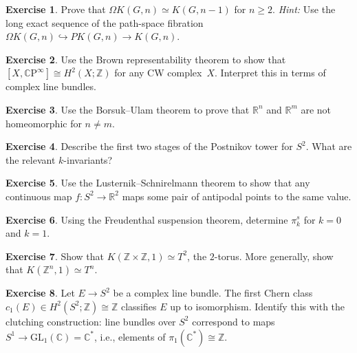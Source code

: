 \documentclass[12pt,a4paper,openany]{book}
\theoremstyle{definition}
\newtheorem{exercise}{Exercise}[chapter]
\theoremstyle{plain}
\theoremstyle{remark}
\newcommand{\Z}{\mathbb{Z}}
\newcommand{\R}{\mathbb{R}}
\newcommand{\C}{\mathbb{C}}
\newcommand{\CP}{\mathbb{C}\mathrm{P}}
\begin{document}
\begin{exercise}
Prove that $\Omega K(G,n)\simeq K(G,n-1)$ for $n\ge2$.
\textit{Hint:} Use the long exact sequence of the path-space fibration
$\Omega K(G,n)\hookrightarrow PK(G,n)\to K(G,n)$.
\end{exercise}

\begin{exercise}
Use the Brown representability theorem to show that
$[X,\CP^\infty]\cong H^2(X;\Z)$ for any CW complex~$X$.  Interpret
this in terms of complex line bundles.
\end{exercise}

\begin{exercise}
Use the Borsuk--Ulam theorem to prove that $\R^n$ and $\R^m$ are not
homeomorphic for $n\ne m$.
\end{exercise}

\begin{exercise}
Describe the first two stages of the Postnikov tower for $S^2$.
What are the relevant $k$-invariants?
\end{exercise}

\begin{exercise}
Use the Lusternik--Schnirelmann theorem to show that any continuous map
$f\colon S^2\to\R^2$ maps some pair of antipodal points to the same
value.
\end{exercise}

\begin{exercise}
Using the Freudenthal suspension theorem, determine $\pi_k^s$ for
$k=0$ and $k=1$.
\end{exercise}

\begin{exercise}
Show that $K(\Z\times\Z,1)\simeq T^2$, the $2$-torus.  More
generally, show that $K(\Z^n,1)\simeq T^n$.
\end{exercise}

\begin{exercise}
Let $E\to S^2$ be a complex line bundle.  The first Chern class
$c_1(E)\in H^2(S^2;\Z)\cong\Z$ classifies $E$ up to isomorphism.
Identify this with the clutching construction: line bundles over $S^2$ correspond to maps
$S^1\to\mathrm{GL}_1(\C)=\C^*$, i.e., elements of
$\pi_1(\C^*)\cong\Z$.
\end{exercise}
\end{document}
